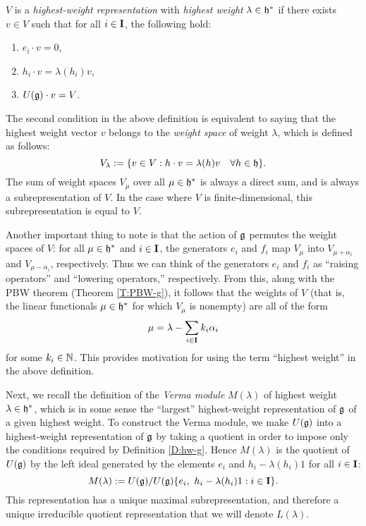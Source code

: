\begin{definition}\label{D:hw-g}
    $V$ is a \emph{highest-weight representation} with \emph{highest weight} $\lambda\in\mathfrak{h}^*$ if there exists $v\in V$ such that for all $i\in\mathbf{I}$, the following hold:
    \begin{enumerate}
        \item $e_i\cdot v = 0$,
        \item $h_i\cdot v = \lambda(h_i)v$,
        \item $U(\mathfrak{g})\cdot v = V$.
    \end{enumerate}
\end{definition}

The second condition in the above definition is equivalent to saying that the highest weight vector $v$ belongs to the \emph{weight space} of weight $\lambda$, which is defined as follows:
\[V_\lambda := \{v\in V : h\cdot v = \lambda(h)v \quad \forall h\in\mathfrak{h}\}.\]
The sum of weight spaces $V_\mu$ over all $\mu\in\mathfrak{h}^*$ is always a direct sum, and is always a subrepresentation of $V$.
In the case where $V$ is finite-dimensional, this subrepresentation is equal to $V$.

Another important thing to note is that the action of $\mathfrak{g}$ permutes the weight spaces of $V$: for all $\mu\in\mathfrak{h}^*$ and $i\in\mathbf{I}$, the generators $e_i$ and $f_i$ map $V_\mu$ into $V_{\mu+\alpha_i}$ and $V_{\mu-\alpha_i}$, respectively.
Thus we can think of the generators $e_i$ and $f_i$ as ``raising operators'' and ``lowering operators,'' respectively.
From this, along with the PBW theorem (Theorem \ref{T:PBW-g}), it follows that the weights of $V$ (that is, the linear functionals $\mu\in\mathfrak{h}^*$ for which $V_\mu$ is nonempty) are all of the form
\[\mu = \lambda - \sum_{i\in\mathbf{I}} k_i\alpha_i\]
for some $k_i\in\mathbb{N}$.
This provides motivation for using the term ``highest weight'' in the above definition.

Next, we recall the definition of the \emph{Verma module} $M(\lambda)$ of highest weight $\lambda\in\mathfrak{h}^*$, which is in some sense the ``largest'' highest-weight representation of $\mathfrak{g}$ of a given highest weight.
To construct the Verma module, we make $U(\mathfrak{g})$ into a highest-weight representation of $\mathfrak{g}$ by taking a quotient in order to impose only the conditions required by Definition \ref{D:hw-g}.
Hence $M(\lambda)$ is the quotient of $U(\mathfrak{g})$ by the left ideal generated by the elements $e_i$ and $h_i-\lambda(h_i)1$ for all $i\in\mathbf{I}$:
\[M(\lambda) := U(\mathfrak{g}) / U(\mathfrak{g}) \{e_i,\ h_i-\lambda(h_i)1 : i\in\mathbf{I}\}.\]
This representation has a unique maximal subrepresentation, and therefore a unique irreducible quotient representation that we will denote $L(\lambda)$.

